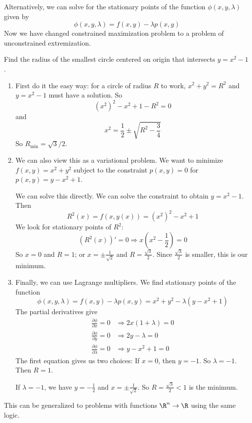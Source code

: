 \documentclass[a4paper]{article}
\begin{document}
Alternatively, we can solve for the stationary points of the function $\phi(x, y, \lambda)$ given by
\[
  \phi(x, y, \lambda) = f(x, y) - \lambda p(x, y)
\]
Now we have changed constrained maximization problem to a problem of unconstrained extremization.

\begin{eg}
  Find the radius of the smallest circle centered on origin that intersects $y = x^2 - 1$.

  \begin{enumerate}
    \item  First do it the easy way: for a circle of radius $R$ to work, $x^2 + y^2 = R^2$ and $y = x^2 - 1$ must have a solution. So
      \[
        (x^2)^2 - x^2 + 1 - R^2 = 0
      \]
      and
      \[
        x^2 = \frac{1}{2}\pm \sqrt{R^2 - \frac{3}{4}}
      \]
      So $R_{\min} = \sqrt{3}/2$.

    \item We can also view this as a variational problem. We want to minimize $f(x, y) = x^2 + y^2$ subject to the constraint $p(x, y) = 0$ for $p(x, y) = y - x^2 + 1$.

      We can solve this directly. We can solve the constraint to obtain $y = x^2 - 1$. Then
      \[
        R^2(x) = f(x, y(x)) = (x^2)^2 - x^2  + 1
      \]
      We look for stationary points of $R^2$:
      \[
        (R^2(x))' = 0 \Rightarrow  x\left(x^2 - \frac{1}{2}\right)= 0
      \]
      So $x = 0$ and $R = 1$; or $x = \pm \frac{1}{\sqrt{2}}$ and $R = \frac{\sqrt{3}}{2}$. Since $\frac{\sqrt{3}}{2}$ is smaller, this is our minimum.

    \item Finally, we can use Lagrange multipliers. We find stationary points of the function
      \[
        \phi(x, y, \lambda) = f(x, y) - \lambda p(x, y) = x^2 + y^2 - \lambda (y - x^2 + 1)
      \]
      The partial derivatives give
      \begin{align*}
        \frac{\partial \phi}{\partial x} = 0 &\Rightarrow 2x(1 + \lambda) = 0\\
        \frac{\partial \phi}{\partial y} = 0 &\Rightarrow 2y - \lambda = 0\\
        \frac{\partial \phi}{\partial \lambda} = 0 &\Rightarrow y - x^2 + 1 = 0
      \end{align*}
      The first equation gives us two choices: If $x = 0$, then $y = -1$. So $\lambda = -1$. Then $R = 1$.

      If $\lambda = -1$, we have $y = -\frac{1}{2}$ and $x = \pm \frac{1}{\sqrt{2}}$. So $R = \frac{\sqrt{3}}{2} < 1$ is the minimum.
  \end{enumerate}
\end{eg}
This can be generalized to problems with functions $\R^n \to \R$ using the same logic.
\end{document}
